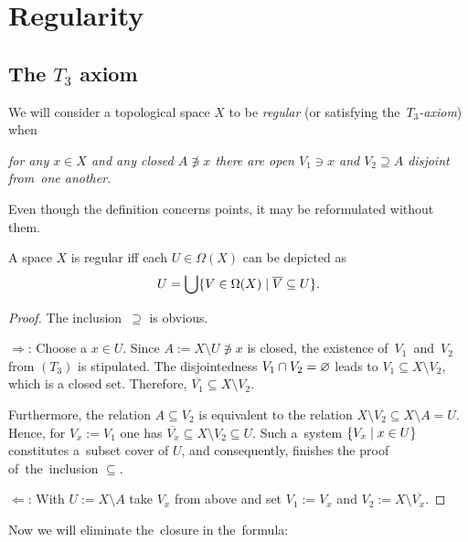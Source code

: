 \chapter{Regularity}

\section{The $T_3$ axiom}

\begin{framed}
  \begin{df}[$T_3$]
    We will consider a topological space $X$ to be \emph{regular\/} (or
    satisfying the~\emph{$T_3$-axiom\/}) when
    \begin{center} \it
      for any $x\in X$ and any closed $A \not\owns x$ there are open $V_1\owns
      x$ and $V_2\supseteq A$ disjoint from~one another.
    \end{center}
  \end{df}
\end{framed}

Even though the definition concerns points, it may be reformulated without
them.

\begin{prop} \label{reg-char}
  A space $X$ is regular iff each $U\in \Omega(X)$ can be depicted as
  \[
    U = \bigcup \{V\in \Omega(X) \mid \overline{V} \subseteq U\}.
  \]
\end{prop}
\begin{proof}
  The inclusion~$\supseteq$ is obvious.

  $\Rightarrow$:
  Choose a $x\in U$.
  Since $A := X\setminus U \not\owns x$ is closed, the existence
  of~$V_1$~and~$V_2$ from $(T_3)$ is stipulated.
  The disjointedness $V_1 \cap V_2 = \varnothing$ leads to $V_1\subseteq X\setminus
  V_2$, which is a closed set.
  Therefore, $\overline{V_1}\subseteq X\setminus V_2$.

  Furthermore, the relation $A\subseteq V_2$ is equivalent to the relation
  $X\setminus V_2\subseteq X \setminus A = U$.
  Hence, for $V_x := V_1$ one has $\overline{V_x}\subseteq X\setminus V_2\subseteq
  U$.
  Such a~system $\{V_x \mid x\in U\}$ constitutes a~subset cover of $U$, and
  consequently, finishes the proof of~the~inclusion $\subseteq$.

  $\Leftarrow$:
  With $U := X\setminus A$ take $V_x$ from above and set $V_1 := V_x$ and $V_2
  := X\setminus \overline{V_x}$.
\end{proof}

Now we will eliminate the~closure in the~formula:

